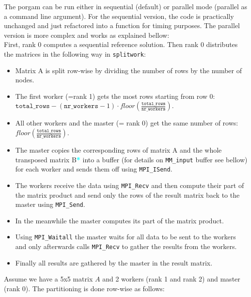 The porgam can be run either in sequential (default) or parallel mode (parallel as a command line argument). For the sequential version, the code is practically unchanged and just refactored into a function for timing purposes. The parallel version is more complex and works as explained bellow: \\
First, rank 0 computes a sequential reference solution. Then rank 0 distributes the matrices in the following way in \texttt{splitwork}: 
\begin{itemize}
    \item Matrix A is split row-wise by dividing the number of rows by the number of nodes.
    \item The first worker (=rank 1) gets the most rows starting from row 0: \\$\texttt{total\_rows} - (\texttt{nr\_workers}-1) \cdot \textit{floor}(\frac{\texttt{total\_rows}}{\texttt{nr\_workers}})$.
    \item All other workers and the master (= rank 0) get the same number of rows: $\textit{floor}(\frac{\texttt{total\_rows}}{\texttt{nr\_workers}})$.
    \item The master copies the corresponding rows of matrix A and the whole transposed matrix B\textcolor{cyan}{\textbf{*}} into a buffer (for details on \texttt{MM\_input} buffer see bellow) for each worker and sends them off using \texttt{MPI\_ISend}.
    \item The workers receive the data using \texttt{MPI\_Recv} and then compute their part of the matrix product and send only the rows of the result matrix back to the master using \texttt{MPI\_Send}.
    \item In the meanwhile the master computes its part of the matrix product.
    \item Using \texttt{MPI\_Waitall} the master waits for all data to be sent to the workers and only afterwards calls \texttt{MPI\_Recv} to gather the results from the workers.
    \item Finally all results are gathered by the master in the result matrix.
\end{itemize}
Assume we have a 5x5 matrix $A$ and 2 workers (rank 1 and rank 2) and master (rank 0). The partitioning is done row-wise as follows:

